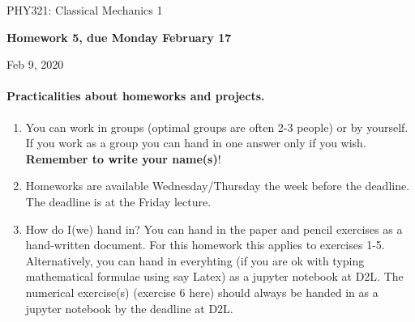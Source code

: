 \documentclass[%
oneside,                 %
final,                   %
10pt]{article}
\begin{document}

\newcommand{\exercisesection}[1]{\subsection*{#1}}






\thispagestyle{empty}

\begin{center}
{\LARGE\bf
\begin{spacing}{1.25}
PHY321: Classical Mechanics 1
\end{spacing}
}
\end{center}


\begin{center}
{\bf Homework 5, due Monday  February 17${}^{}$} \\ [0mm]
\end{center}

\begin{center}
\end{center}
    

\begin{center}
Feb 9, 2020
\end{center}

\vspace{1cm}


\paragraph{Practicalities about  homeworks and projects.}
\begin{enumerate}
\item You can work in groups (optimal groups are often 2-3 people) or by yourself. If you work as a group you can hand in one answer only if you wish. \textbf{Remember to write your name(s)}!

\item Homeworks are available Wednesday/Thursday the week before the deadline. The deadline is at the Friday lecture.

\item How do I(we)  hand in?  You can hand in the paper and pencil exercises as a hand-written document. For this homework this applies to exercises 1-5. Alternatively, you can hand in everyhting (if you are ok with typing mathematical formulae using say Latex) as a jupyter notebook at D2L. The numerical exercise(s) (exercise 6 here) should always be handed in as a jupyter notebook by the deadline at D2L. 
\end{enumerate}
\end{document}
